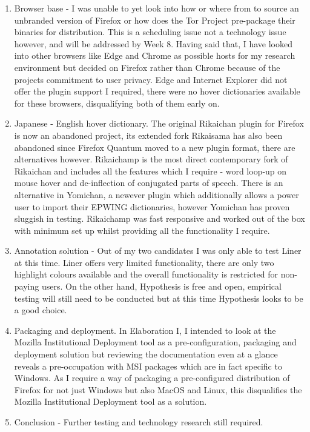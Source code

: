 \documentclass{article}
\begin{document}
\begin{enumerate}
    \item Browser base - I was unable to yet look into how or where from to source an unbranded version of Firefox or how does the Tor Project pre-package their binaries for distribution. This is a scheduling issue not a technology issue however, and will be addressed by Week 8. Having said that, I have looked into other browsers like Edge and Chrome as possible hosts for my research environment but decided on Firefox rather than Chrome because of the projects commitment to user privacy. Edge and Internet Explorer did not offer the plugin support I required, there were no hover dictionaries available for these browsers, disqualifying both of them early on.
    \item Japanese - English hover dictionary. The original Rikaichan plugin for Firefox is now an abandoned project, its extended fork Rikaisama has also been abandoned since Firefox Quantum moved to a new plugin format, there are alternatives however. Rikaichamp is the most direct contemporary fork of Rikaichan and includes all the features which I require - word loop-up on mouse hover and de-inflection of conjugated parts of speech. There is an alternative in Yomichan, a newever plugin which additionally allows a power user to import their EPWING dictionaries, however Yomichan has proven sluggish in testing. Rikaichamp was fast responsive and worked out of the box with minimum set up whilst providing all the functionality I require.
    \item Annotation solution - Out of my two candidates I was only able to test Liner at this time. Liner offers very limited functionality, there are only two highlight colours available and the overall functionality is restricted for non-paying users. On the other hand, Hypothesis is free and open, empirical testing will still need to be conducted but at this time Hypothesis looks to be a good choice.
    \item Packaging and deployment. In Elaboration I, I intended to look at the Mozilla Institutional Deployment tool as a pre-configuration, packaging and deployment solution but reviewing the documentation even at a glance reveals a pre-occupation with MSI packages which are in fact specific to Windows. As I require a way of packaging a pre-configured distribution of Firefox for not just Windows but also MacOS and Linux, this disqualifies the Mozilla Institutional Deployment tool as a solution.
    \item Conclusion - Further testing and technology research still required.
\end{enumerate}
\end{document}
